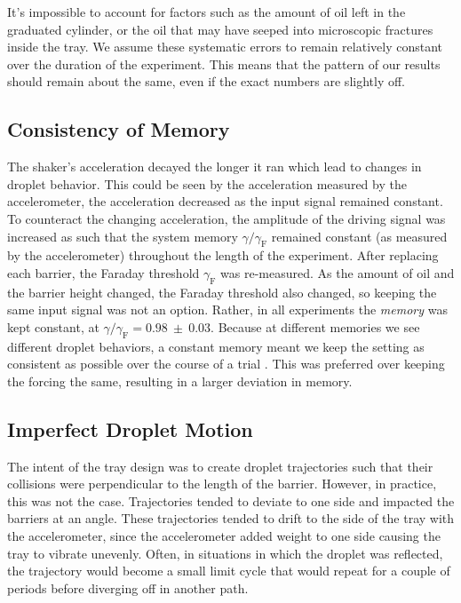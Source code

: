 It's impossible to account for factors such as the amount of oil left in the graduated cylinder, or the oil that may have seeped into microscopic fractures inside the tray. We assume these systematic errors to remain relatively constant over the duration of the experiment. This means that the pattern of our results should remain about the same, even if the exact numbers are slightly off. 

    \subsection{Consistency of Memory}
The shaker's acceleration decayed the longer it ran which lead to changes in droplet behavior. This could be seen by the acceleration measured by the accelerometer, the acceleration decreased as the input signal remained constant. To counteract the changing acceleration, the amplitude of the driving signal was increased as such that the system memory $\gamma/\gamma_\mathrm{F}$ remained constant (as measured by the accelerometer) throughout the length of the experiment. After replacing each barrier, the Faraday threshold $\gamma_\mathrm{F}$ was re-measured. As the amount of oil and the barrier height changed, the Faraday threshold also changed, so keeping the same input signal was not an option. Rather, in all experiments the \textit{memory} was kept constant, at $\gamma/\gamma_\mathrm{F} = \mathbf{0.98~\pm~0.03}$. Because at different memories we see different droplet behaviors, a constant memory meant we keep the setting as consistent as possible over the course of a trial . This was preferred over keeping the forcing the same, resulting in a larger deviation in memory. 

    \subsection{Imperfect Droplet Motion}
The intent of the tray design was to create droplet trajectories such that their collisions were perpendicular to the length of the barrier. However, in practice, this was not the case. Trajectories tended to deviate to one side and impacted the barriers at an angle. These trajectories tended to drift to the side of the tray with the accelerometer, since the accelerometer added weight to one side causing the tray to vibrate unevenly. Often, in situations in which the droplet was reflected, the trajectory would become a small limit cycle that would repeat for a couple of periods before diverging off in another path. 

